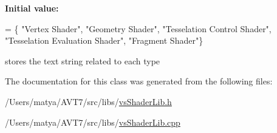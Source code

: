 {\bfseries Initial value\+:}
\begin{DoxyCode}
= \{
        \textcolor{stringliteral}{"Vertex Shader"},
        \textcolor{stringliteral}{"Geometry Shader"},
        \textcolor{stringliteral}{"Tesselation Control Shader"},
        \textcolor{stringliteral}{"Tesselation Evaluation Shader"},
        \textcolor{stringliteral}{"Fragment Shader"}\}
\end{DoxyCode}


stores the text string related to each type 



The documentation for this class was generated from the following files\+:\begin{DoxyCompactItemize}
\item 
/\+Users/matya/\+A\+V\+T7/src/libs/\hyperlink{vs_shader_lib_8h}{vs\+Shader\+Lib.\+h}\item 
/\+Users/matya/\+A\+V\+T7/src/libs/\hyperlink{vs_shader_lib_8cpp}{vs\+Shader\+Lib.\+cpp}\end{DoxyCompactItemize}
